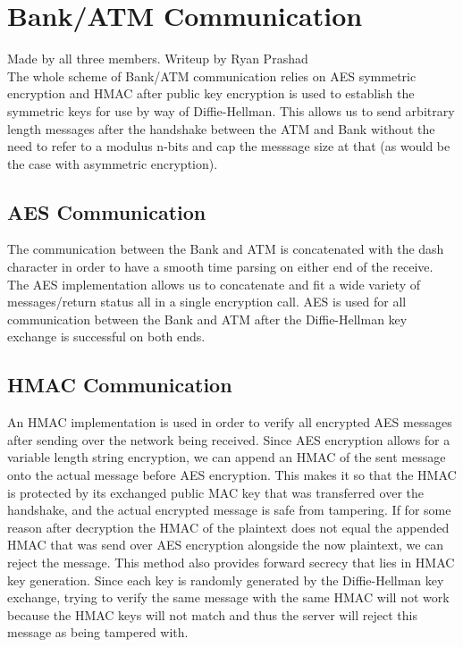 \section{Bank/ATM Communication}\label{sec:batmcoms}
Made by all three members. Writeup by Ryan Prashad\\

	\medskip
	The whole scheme of Bank/ATM communication relies on AES symmetric encryption and HMAC after public key encryption is used to  establish the symmetric keys for use by way of Diffie-Hellman. This allows us to send arbitrary length messages after the handshake between the ATM and Bank without the need to refer to a modulus n-bits and cap the messsage size at that (as would be the case with asymmetric encryption).
	
	\subsection{AES Communication}\label{sec:aescoms}
		The communication between the Bank and ATM is concatenated with the dash character in order to have a smooth time parsing on either end of the receive. The AES implementation allows us to concatenate and fit a wide variety of messages/return status all in a single encryption call. AES is used for all communication between the Bank and ATM after the Diffie-Hellman key exchange is successful on both ends.
	
	\subsection{HMAC Communication}\label{sec:hmaccoms}
		An HMAC implementation is used in order to verify all encrypted AES messages after sending over the network being received. Since AES encryption allows for a variable length string encryption, we can append an HMAC of the sent message onto the actual message before AES encryption. This makes it so that the HMAC is protected by its exchanged public MAC key that was transferred over the handshake, and the actual encrypted message is safe from tampering. If for some reason after decryption the HMAC of the plaintext does not equal the appended HMAC that was send over AES encryption alongside the now plaintext, we can reject the message. This method also provides forward secrecy that lies in HMAC key generation. Since each key is randomly generated by the Diffie-Hellman key exchange, trying to verify the same message with the same HMAC will not work because the HMAC keys will not match and thus the server will reject this message as being tampered with.
